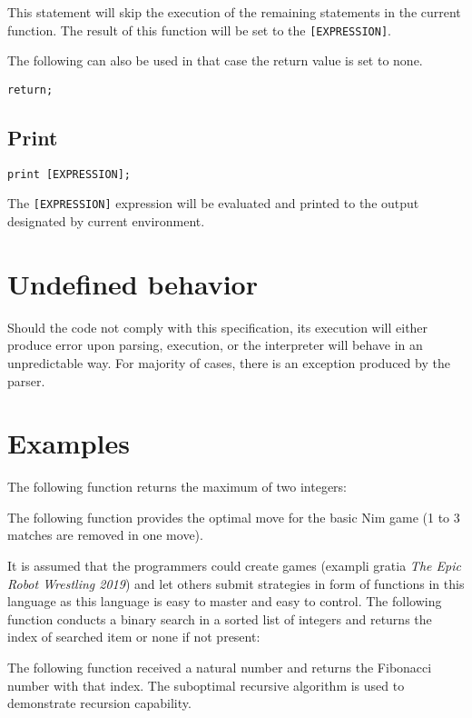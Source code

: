 \documentclass[a4paper,11pt,openany]{article}
\begin{document}
This statement will skip the execution of the remaining statements in the current function. The result of this function will be set to the \texttt{[EXPRESSION]}.

The following can also be used in that case the return value is set to none.

\begin{lstlisting}
return;
\end{lstlisting}

\subsection{Print}

\begin{lstlisting}[frame=none]
print [EXPRESSION];\end{lstlisting}

The \texttt{[EXPRESSION]} expression will be evaluated and printed to the output designated by current environment.

\section{Undefined behavior}

Should the code not comply with this specification, its execution will either produce error upon parsing, execution, or the interpreter will behave in an unpredictable way. For majority of cases, there is an exception produced by the parser.

\section{Examples}
The following function returns the maximum of two integers:

The following function provides the optimal move for the basic Nim game (1 to 3 matches are removed in one move).

It is assumed that the programmers could create games (exampli gratia \textit{The Epic Robot Wrestling 2019}) and let others submit strategies in form of functions in this language as this language is easy to master and easy to control.
The following function conducts a binary search in a sorted list of integers and returns the index of searched item or none if not present:

The following function received a natural number and returns the Fibonacci number with that index. The suboptimal recursive algorithm is used to demonstrate recursion capability.

\end{document}
